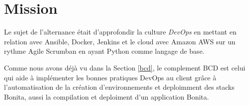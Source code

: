 \section{Mission}
Le sujet de l'alternance était d'approfondir la culture \emph{DevOps} en mettant en relation avec Ansible, Docker, Jenkins et le cloud avec Amazon AWS sur un rythme Agile Scrumban en ayant Python comme langage de base.

Comme nous avons déjà vu dans la Section \ref{bcd}, le complement BCD est celui qui aide à implémenter les bonnes pratiques DevOps au client grâce à l'automatisation de la création d'environnements et deploimment des stacks Bonita, aussi la compilation et deploiment d'un application Bonita.












